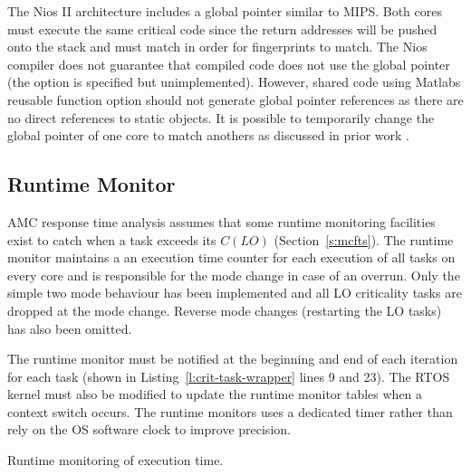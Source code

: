 
	The Nios II architecture includes a global pointer similar to MIPS. 
	Both cores must execute the same critical code since the return addresses will be pushed onto the stack and must match in order for fingerprints to match. 
	The Nios compiler does not guarantee that compiled code does not use the global pointer (the option is specified but unimplemented). 
	However, shared code using Matlabs reusable function option should not generate global pointer references as there are no direct references to static objects. 
	It is possible to temporarily change the global pointer of one core to match anothers as discussed in prior work \cite{ugthesis}.


\subsection{Runtime Monitor}

	AMC response time analysis assumes that some runtime monitoring facilities exist to catch when a task exceeds its $C(LO)$ (Section~\ref{s:mcfts}). 
	The runtime monitor maintains a an execution time counter for each execution of all tasks on every core and is responsible for the mode change in case of an overrun.
	Only the simple two mode behaviour has been implemented and all LO criticality tasks are dropped at the mode change. 
	Reverse mode changes (restarting the LO tasks) has also been omitted.

	The runtime monitor must be notified at the beginning and end of each iteration for each task (shown in Listing~\ref{l:crit-task-wrapper} lines 9 and 23). 
	The RTOS kernel must also be modified to update the runtime monitor tables when a context switch occurs. 
	The runtime monitors uses a dedicated timer rather than rely on the OS software clock to improve precision.

\begin{algorithm}
	\caption{Runtime monitoring of execution time.}
	\label{a:run-mon}
\end{algorithm}
 



